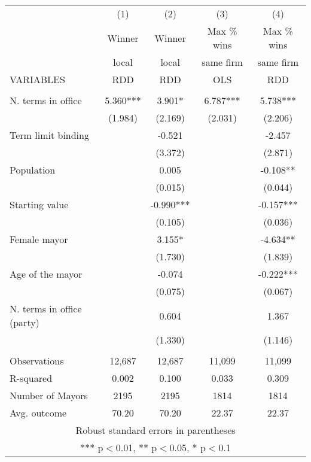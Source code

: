 \documentclass[]{article}
\begin{document}
\begin{tabular}{lcccc} \hline
 & (1) & (2) & (3) & (4) \\
 & Winner & Winner & Max \% wins & Max \% wins \\
 & local & local & same firm & same firm \\
VARIABLES & RDD & RDD & OLS & RDD \\ \hline
 &  &  &  &  \\
N. terms in office & 5.360*** & 3.901* & 6.787*** & 5.738*** \\
 & (1.984) & (2.169) & (2.031) & (2.206) \\
Term limit binding &  & -0.521 &  & -2.457 \\
 &  & (3.372) &  & (2.871) \\
Population &  & 0.005 &  & -0.108** \\
 &  & (0.015) &  & (0.044) \\
Starting value &  & -0.990*** &  & -0.157*** \\
 &  & (0.105) &  & (0.036) \\
Female mayor &  & 3.155* &  & -4.634** \\
 &  & (1.730) &  & (1.839) \\
Age of the mayor &  & -0.074 &  & -0.222*** \\
 &  & (0.075) &  & (0.067) \\
N. terms in office (party) &  & 0.604 &  & 1.367 \\
 &  & (1.330) &  & (1.146) \\
 &  &  &  &  \\
Observations & 12,687 & 12,687 & 11,099 & 11,099 \\
R-squared & 0.002 & 0.100 & 0.033 & 0.309 \\
Number of Mayors & 2195 & 2195 & 1814 & 1814 \\
 Avg. outcome & 70.20 & 70.20 & 22.37 & 22.37 \\ \hline
\multicolumn{5}{c}{ Robust standard errors in parentheses} \\
\multicolumn{5}{c}{ *** p$<$0.01, ** p$<$0.05, * p$<$0.1} \\
\end{tabular}
\end{document}

